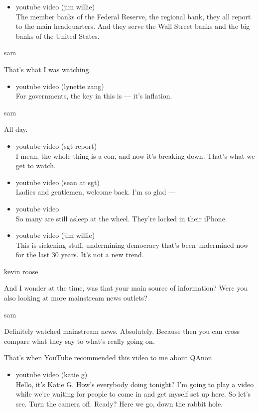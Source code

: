 \begin{itemize}
\tightlist
\item
  youtube video (jim willie)\\
  The member banks of the Federal Reserve, the regional bank, they all
  report to the main headquarters. And they serve the Wall Street banks
  and the big banks of the United States.
\end{itemize}

sam

That's what I was watching.

\begin{itemize}
\tightlist
\item
  youtube video (lynette zang)\\
  For governments, the key in this is --- it's inflation.
\end{itemize}

sam

All day.

\begin{itemize}
\item
  youtube video (sgt report)\\
  I mean, the whole thing is a con, and now it's breaking down. That's
  what we get to watch.
\item
  youtube video (sean at sgt)\\
  Ladies and gentlemen, welcome back. I'm so glad ---
\item
  youtube video\\
  So many are still asleep at the wheel. They're locked in their iPhone.
\item
  youtube video (jim willie)\\
  This is sickening stuff, undermining democracy that's been undermined
  now for the last 30 years. It's not a new trend.
\end{itemize}

kevin roose

And I wonder at the time, was that your main source of information? Were
you also looking at more mainstream news outlets?

sam

Definitely watched mainstream news. Absolutely. Because then you can
cross compare what they say to what's really going on.

That's when YouTube recommended this video to me about QAnon.

\begin{itemize}
\tightlist
\item
  youtube video (katie g)\\
  Hello, it's Katie G. How's everybody doing tonight? I'm going to play
  a video while we're waiting for people to come in and get myself set
  up here. So let's see. Turn the camera off. Ready? Here we go, down
  the rabbit hole.
\end{itemize}

